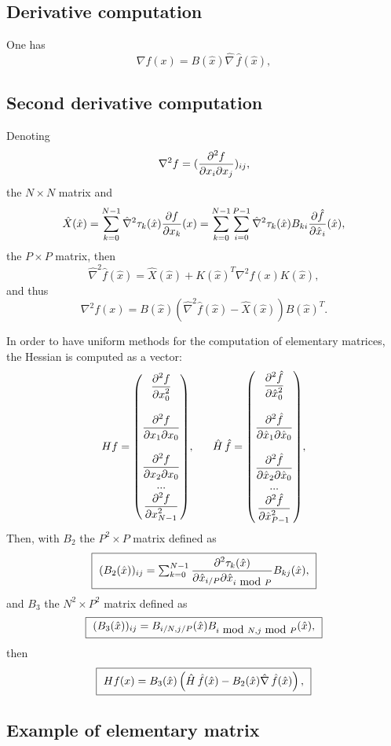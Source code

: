 \documentclass[11pt,a4paper]{article}
\begin{document}
\subsection{Derivative computation}
One has
$$ \nabla f(x) = B(\hat{x}) \hat{\nabla}\,\hat{f}(\hat{x}), $$
\subsection{Second derivative computation}
Denoting 
$$ \nabla^2 f = ({{\displaystyle \frac{\displaystyle \partial^2 f}{\displaystyle \partial x_i \partial x_j}}})_{ij}, $$
the $N \times N$ matrix and
$$ \hat{X}(\hat{x}) = \sum_{k = 0}^{N-1} \hat{\nabla}^2 \tau_k(\hat{x}) {\displaystyle \frac{\displaystyle \partial f}{\displaystyle \partial x_k}}(x) = \sum_{k = 0}^{N-1} \sum_{i = 0}^{P-1} \hat{\nabla}^2 \tau_k(\hat{x}) B_{ki} {\displaystyle \frac{\displaystyle \partial \hat{f}}{\displaystyle \partial \hat{x}_i}}(\hat{x}), $$
the $P \times P$ matrix, then
$$ \hat{\nabla}^2 \hat{f}(\hat{x}) = \hat{X}(\hat{x}) + K(\hat{x})^T \nabla^2 f(x) K(\hat{x}), $$
and thus
$$ \nabla^2 f(x) = B(\hat{x}) (\hat{\nabla}^2 \hat{f}(\hat{x}) - \hat{X}(\hat{x})) B(\hat{x})^T. $$

In order to have uniform methods for the computation of elementary matrices, the Hessian is computed as a vector:
$$  H f = \vecseven{\Frac{\partial^2 f}{\partial x^2_0}}{}{\Frac{\partial^2 f}{\partial x_1 \partial x_0}}{}{\Frac{\partial^2 f}{\partial x_2 \partial x_0}}{...}{\Frac{\partial^2 f}{\partial x^2_{N-1}}},\ \ \ \ \ 
    \hat{H}\,\hat{f} = \vecseven{\Frac{\partial^2 \hat{f}}{\partial \hat{x}^2_0}}{}{\Frac{\partial^2 \hat{f}}{\partial \hat{x}_1 \partial \hat{x}_0}}{}{\Frac{\partial^2 \hat{f}}{\partial \hat{x}_2 \partial \hat{x}_0}}{...}{\Frac{\partial^2 \hat{f}}{\partial \hat{x}^2_{P-1}}}, $$
Then, with $B_2$ the $P^2 \times P$ matrix defined as
$$ \fbox{ $(B_2(\hat{x}))_{ij} = \sum_{k = 0}^{N-1} {\displaystyle \frac{\displaystyle \partial^2 \tau_k(\hat{x})}{\displaystyle \partial \hat{x}_{i / P} \partial \hat{x}_{i \mbox{ mod } P} }} B_{kj}(\hat{x}),$ } $$
and $B_3$ the $N^2 \times P^2$ matrix defined as
$$ \fbox{ $(B_3(\hat{x}))_{ij} = B_{i / N, j / P}(\hat{x}) B_{i \mbox{ mod } N, j \mbox{ mod } P}(\hat{x}), $ } $$
then
$$ \fbox{ $H f(x) = B_3(\hat{x}) \left(\hat{H}\,\hat{f}(\hat{x}) - B_2(\hat{x})\hat{\nabla}\,\hat{f}(\hat{x})\right), $ } $$

\subsection{Example of elementary matrix} \label{elmminst}
\end{document}
